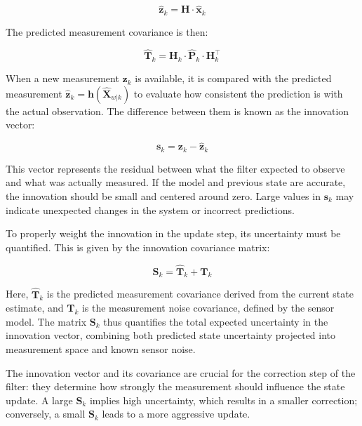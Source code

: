 \begin{equation}
  \hat{\mathbf{z}}_k = \mathbf{H} \cdot \hat{\mathbf{x}}_k
\end{equation}

The predicted measurement covariance is then:

\begin{equation}
  \hat{\mathbf{T}}_k = \mathbf{H}_k \cdot \hat{\mathbf{P}}_k \cdot \mathbf{H}_k^\top
\end{equation}

When a new measurement $\mathbf{z}_k$ is available, it is compared with the predicted measurement 
$\hat{\mathbf{z}}_k = \mathbf{h}(\hat{\mathbf{X}}_{w|k})$ to evaluate how consistent the prediction is 
with the actual observation. The difference between them is known as the innovation vector:

\begin{equation}
  \mathbf{s}_k = \mathbf{z}_k - \hat{\mathbf{z}}_k
\end{equation}

This vector represents the residual between what the filter expected to observe and what was actually measured. 
If the model and previous state are accurate, the innovation should be small and centered around zero. 
Large values in $\mathbf{s}_k$ may indicate unexpected changes in the system or incorrect predictions.

To properly weight the innovation in the update step, its uncertainty must be quantified. This is given by the 
innovation covariance matrix:

\begin{equation}
  \mathbf{S}_k = \hat{\mathbf{T}}_k + \mathbf{T}_k
\end{equation}

Here, $\hat{\mathbf{T}}_k$ is the predicted measurement covariance derived from the current state estimate, and 
$\mathbf{T}_k$ is the measurement noise covariance, defined by the sensor model. The matrix $\mathbf{S}_k$ thus 
quantifies the total expected uncertainty in the innovation vector, combining both predicted state uncertainty 
projected into measurement space and known sensor noise.

The innovation vector and its covariance are crucial for the correction step of the filter: they determine how 
strongly the measurement should influence the state update. A large $\mathbf{S}_k$ implies high uncertainty, 
which results in a smaller correction; conversely, a small $\mathbf{S}_k$ leads to a more aggressive update.

